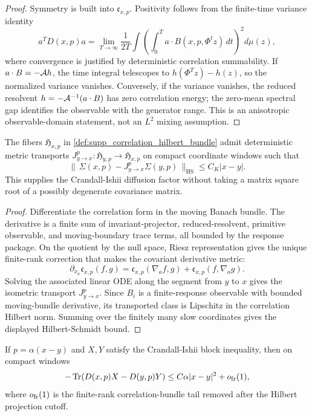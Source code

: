\begin{proof}
Symmetry is built into \(\mathfrak c_{x,p}\).  Positivity follows from the
finite-time variance identity
\[
  a^TD(x,p)a
  =
  \lim_{T\to\infty}\frac1{2T}
  \int\left(\int_0^T a\cdot B(x,p,\Phi^t z)\,dt\right)^2d\mu(z),
\]
where convergence is justified by deterministic correlation summability.  If
\(a\cdot B=-\mathcal A h\), the time integral telescopes to
\(h(\Phi^Tz)-h(z)\), so the normalized variance vanishes.  Conversely, if the
variance vanishes, the reduced resolvent \(h=-\mathcal A^{-1}(a\cdot B)\) has zero
correlation energy; the zero-mean spectral gap identifies the observable with
the generator range.  This is an anisotropic observable-domain statement, not
an \(L^2\) mixing assumption.
\end{proof}

\begin{proposition}
\label{prop:supp_correlation_factor_transport}
The fibers \(\mathfrak H_{x,p}\) in
\cref{def:supp_correlation_hilbert_bundle} admit deterministic metric
transports \(J^p_{y\to x}:\mathfrak H_{y,p}\to\mathfrak H_{x,p}\) on compact
coordinate windows such that
\[
  \|\,\Sigma(x,p)-J^p_{y\to x}\Sigma(y,p)\,\|_{\mathrm{HS}}
  \le C_K|x-y|.
\]
This supplies the Crandall-Ishii diffusion factor without taking a matrix
square root of a possibly degenerate covariance matrix.
\end{proposition}

\begin{proof}
Differentiate the correlation form in the moving Banach bundle.  The derivative
is a finite sum of invariant-projector, reduced-resolvent, primitive
observable, and moving-boundary trace terms, all bounded by the response
package.  On the quotient by the null space, Riesz representation gives the
unique finite-rank correction that makes the covariant derivative metric:
\[
  \partial_{x_a}\mathfrak c_{x,p}(f,g)
  =
  \mathfrak c_{x,p}(\nabla_a f,g)
  +\mathfrak c_{x,p}(f,\nabla_a g).
\]
Solving the associated linear ODE along the segment from \(y\) to \(x\) gives
the isometric transport \(J^p_{y\to x}\).  Since \(B_i\) is a
finite-response observable with bounded moving-bundle derivative, its
transported class is Lipschitz in the correlation Hilbert norm.  Summing over
the finitely many slow coordinates gives the displayed Hilbert-Schmidt bound.
\end{proof}

\begin{proposition}
\label{prop:supp_gk_comparison_trace}
If \(p=\alpha(x-y)\) and \(X,Y\) satisfy the Crandall-Ishii block inequality,
then on compact windows
\[
  -\operatorname{Tr}(D(x,p)X-D(y,p)Y)
  \le C\alpha |x-y|^2+o_{\rm fr}(1),
\]
where \(o_{\rm fr}(1)\) is the finite-rank correlation-bundle tail removed
after the Hilbert projection cutoff.
\end{proposition}

